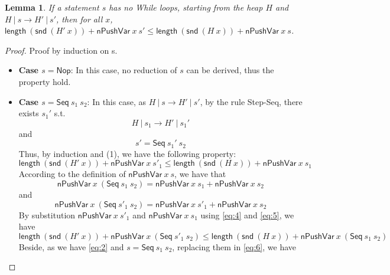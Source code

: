 \documentclass[letter, notitlepage]{article}
\newtheorem{lemma}{Lemma}
\begin{document}
\begin{lemma}\label{lemma:1} If a statement $s$ has no While loops, starting from the heap $H$ and  $H~|~s \to H'~|~s'$, then for all $x$, $\mathsf{length}~(\mathsf{snd}~(H'~x)) + \mathsf{nPushVar}~x~s' \leq \mathsf{length}~(\mathsf{snd}~(H~x)) + \mathsf{nPushVar}~x~s$. 
\end{lemma}
\begin{proof}
	Proof by induction on s.
	\begin{itemize}
		\item 
			\textbf{Case $s=\mathsf{Nop}$}: In this case, no reduction of $s$ can be derived, thus the property hold.
		\item 
			\textbf{Case $s=\mathsf{Seq}~s_1~s_2$}: In this case, as $H~|~s \to H'~|~s'$, by the rule Step-Seq, there exists $s_1'$ s.t. 
			\begin{equation}\label{eq:1}
				H~|~s_1 \to H'~|~s_1'
			\end{equation}
			and
			\begin{equation}\label{eq:2}
				s'=\mathsf{Seq}~s_1'~s_2
			\end{equation}
			Thus, by induction and (1), we have the following property:
			\begin{equation}\label{eq:3}
				\mathsf{length}~(\mathsf{snd}~(H'~x)) + \mathsf{nPushVar}~x~s'_1 \leq \mathsf{length}~(\mathsf{snd}~(H~x)) + \mathsf{nPushVar}~x~s_1
			\end{equation}
			According to the definition of $\mathsf{nPushVar}~x~s$, we have that 
			\begin{equation}\label{eq:4}
				\mathsf{nPushVar}~x~(\mathsf{Seq}~s_1~s_2) = \mathsf{nPushVar}~x~s_1 + \mathsf{nPushVar}~x~s_2
			\end{equation}
			and
			\begin{equation}\label{eq:5}
				\mathsf{nPushVar}~x~(\mathsf{Seq}~s'_1~s_2) = \mathsf{nPushVar}~x~s'_1 + \mathsf{nPushVar}~x~s_2
			\end{equation}
			By substitution $\mathsf{nPushVar}~x~s'_1$ and $\mathsf{nPushVar}~x~s_1$ using \ref{eq:4} and \ref{eq:5}, we have 
			\begin{equation}\label{eq:6}
				\mathsf{length}~(\mathsf{snd}~(H'~x)) + \mathsf{nPushVar}~x~(\mathsf{Seq}~s'_1~s_2) \leq \mathsf{length}~(\mathsf{snd}~(H~x)) + \mathsf{nPushVar}~x~(\mathsf{Seq}~s_1~s_2)
			\end{equation}
			Beside, as we have \ref{eq:2} and $s=\mathsf{Seq}~s_1~s_2$, replacing them in \ref{eq:6}, we have
			\begin{equation}\label{eq:7}

\end{equation}
\end{itemize}
\end{proof}
\end{document}
